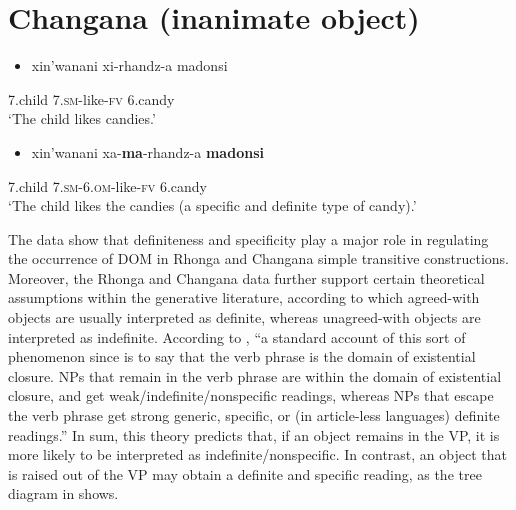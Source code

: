 \documentclass[output=paper]{langsci/langscibook}
\begin{document}
\chapter[]{\rmfamily }
\chapter[Changana (inanimate object)]{Changana (inanimate object)}
\label{bkm:Ref455885216}\setcounter{itemize}{0}
\begin{itemize}
\item \gll xin’wanani        xi-rhandz-a        madonsi\\
\end{itemize}
     7.child              \textsc{7.sm}{}-like-\textsc{fv}       6.candy\\
\glt ‘The child likes candies.’
\z

\begin{itemize}
\item \gll xin’wanani       xa-\textbf{ma}{}-rhandz-a         \textbf{madonsi}\\
\end{itemize}
     7.child              \textsc{7.sm-6.om}{}-like-\textsc{fv}     6.candy\\
\glt ‘The child likes the candies (a specific and definite type of candy).’
\z

The data show that definiteness and specificity play a major role in regulating the occurrence of DOM in Rhonga and Changana simple transitive constructions. Moreover, the Rhonga and Changana data further support certain theoretical assumptions within the generative literature, according to which agreed-with objects are usually interpreted as definite, whereas unagreed-with objects are interpreted as indefinite. According to \citet[199]{Baker2008}, “a standard account of this sort of phenomenon since \citet{Diesing1992} is to say that the verb phrase is the domain of existential closure. NPs that remain in the verb phrase are within the domain of existential closure, and get weak/indefinite/nonspecific readings, whereas NPs that escape the verb phrase get strong generic, specific, or (in article-less languages) definite readings.” In sum, this theory predicts that, if an object remains in the VP, it is more likely to be interpreted as indefinite/nonspecific. In contrast, an object that is raised out of the VP may obtain a definite and specific reading, as the tree diagram in  shows.

\glt   
 
\end{document}
